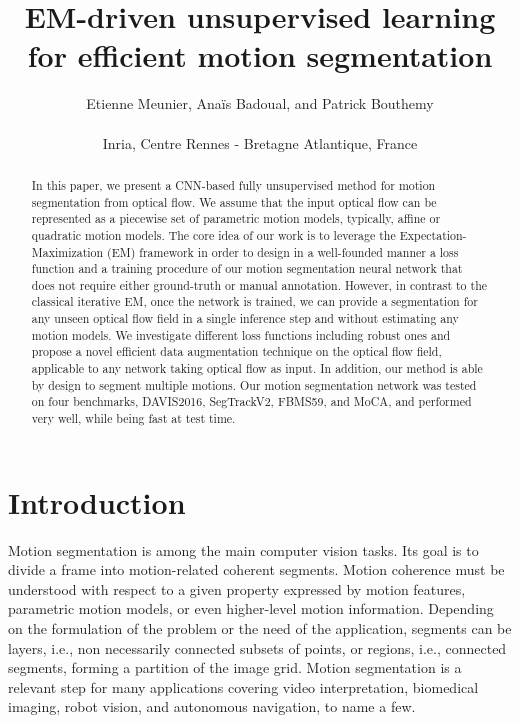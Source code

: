 \documentclass[10pt,twocolumn,letterpaper]{article}
\begin{document}
\title{\bf{EM-driven unsupervised learning \\for efficient motion segmentation}}

\author{Etienne Meunier, Anaïs Badoual, and Patrick Bouthemy \\~\\
Inria, Centre Rennes - Bretagne Atlantique, France}




\maketitle

\begin{abstract}


In this paper, we present a CNN-based fully unsupervised method for motion segmentation from optical flow. We assume that the input optical flow can be represented as a piecewise set of parametric motion models, typically, affine or quadratic motion models. The core idea of our work is to leverage the Expectation-Maximization (EM) framework in order to design in a well-founded manner a loss function and a training procedure of our motion segmentation neural network that does not require either ground-truth or manual annotation. However, in contrast to the classical iterative EM, once the network is trained, we can provide a segmentation for any unseen optical flow field in a single inference step and without estimating any motion models. We investigate different loss functions including robust ones and propose a novel efficient data augmentation technique on the optical flow field,  applicable to any network taking optical flow as input. In addition, our method is able by design to segment multiple motions. Our motion segmentation network was tested on four benchmarks, DAVIS2016, SegTrackV2, FBMS59, and MoCA, and performed very well, while being fast at test time.


\end{abstract}




\section{Introduction}
\label{sec:intro}

Motion segmentation is among the main computer vision tasks. Its goal is to divide a frame into motion-related coherent segments. Motion coherence must be understood with respect to a given property expressed by motion features, parametric motion models, or even higher-level motion information. Depending on the formulation of the problem or the need of the application, segments can be layers, i.e., non necessarily connected subsets of points, or regions, i.e., connected segments, forming a partition of the image grid. Motion segmentation is a relevant step for many applications covering  video interpretation, biomedical imaging, robot vision, and autonomous navigation, to name a few.
\end{document}
